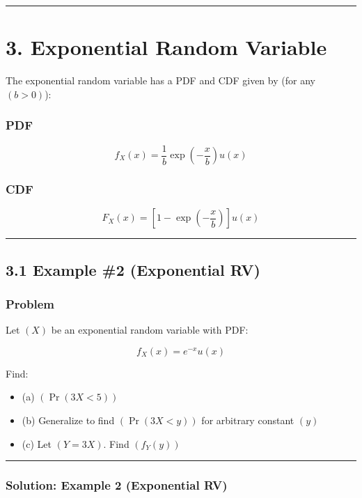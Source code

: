 \documentclass[12pt]{article}
\begin{document}
\hrule
\vspace{1em}

\section*{\textbf{3. Exponential Random Variable}}

The exponential random variable has a PDF and CDF given by (for any $(b>0)$):

\subsubsection*{\textbf{PDF}}

\[
f_X(x)=\frac{1}{b}\exp\left(-\frac{x}{b}\right)u(x)
\]

\subsubsection*{\textbf{CDF}}

\[
F_X(x)=\left[1-\exp\left(-\frac{x}{b}\right)\right]u(x)
\]

\hrule
\vspace{1em}

\subsection*{\textbf{3.1 Example \#2 (Exponential RV)}}

\subsubsection*{\textbf{Problem}}

Let $(X)$ be an exponential random variable with PDF:

\[
f_X(x)=e^{-x}u(x)
\]

Find:

\begin{itemize}
    \item (a) $(\Pr(3X<5))$
    \item (b) Generalize to find $(\Pr(3X<y))$ for arbitrary constant $(y)$
    \item (c) Let $(Y=3X)$. Find $(f_Y(y))$
\end{itemize}

\hrule
\vspace{1em}

\subsubsection*{\textbf{Solution: Example 2 (Exponential RV)}}
\end{document}
